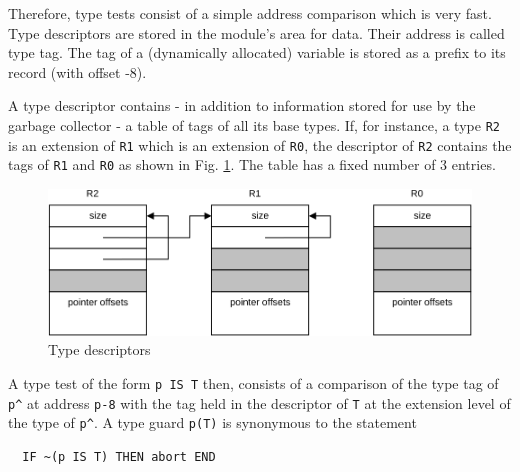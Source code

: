 Therefore, type tests consist of a simple address comparison which is very fast. Type descriptors
are stored in the module's area for data. Their address is called type tag. The tag of a (dynamically
allocated) variable is stored as a prefix to its record (with offset -8).

A type descriptor contains - in addition to information stored for use by the garbage collector - a
table of tags of all its base types. If, for instance, a type \verb|R2| is an extension of \verb|R1|
which is an extension of \verb|R0|, the descriptor of \verb|R2| contains the tags of \verb|R1| and
\verb|R0| as shown in Fig. \ref{fig:typdesc}.  The table has a fixed number of 3 entries.
\begin{figure}[h!]
  \centering
  \includegraphics[width=.8\textwidth]{i/C/4.png}
  \caption{Type descriptors}
  \label{fig:typdesc}
\end{figure}

A type test of the form \verb|p IS T| then, consists of a comparison of the type tag of \verb|p^| at
address \verb|p-8| with the tag held in the descriptor of \verb|T| at the extension level of the type
of \verb|p^|. A type guard \verb|p(T)| is synonymous to the statement
\begin{verbatim}
  IF ~(p IS T) THEN abort END
\end{verbatim}

